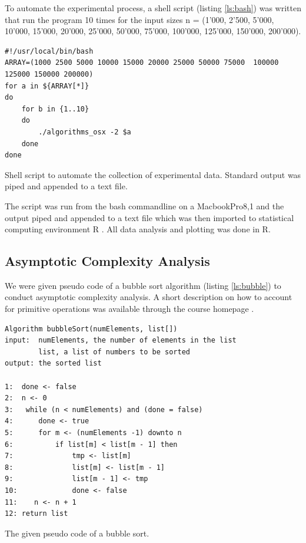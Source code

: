 \documentclass[a4paper,11pt,twoside]{article}
\begin{document}
To automate the experimental process, a shell script (listing \ref{ls:bash}) 
was written that run the program 10 times for the input sizes n = (1'000, 
2'500, 5'000, 10'000, 15'000, 20'000, 25'000, 50'000, 75'000, 100'000,
125'000, 150'000, 200'000).

\begin{listing}

\begin{verbatim}
#!/usr/local/bin/bash                                                                                           
ARRAY=(1000 2500 5000 10000 15000 20000 25000 50000 75000  100000 125000 150000 200000)
for a in ${ARRAY[*]}
do
    for b in {1..10}
    do
        ./algorithms_osx -2 $a
    done
done
\end{verbatim}
\caption{Shell script to automate the collection of experimental
  data. Standard output was piped and appended to a text file.\label{ls:bash}}
\end{listing}

The script was run from the bash commandline on a MacbookPro8,1 and
the output piped and appended to a text file which was then imported
to statistical computing environment R \cite{rlanguage}. All data analysis and
plotting was done in R. 


\subsection{Asymptotic Complexity Analysis}
We were given pseudo code of a bubble sort algorithm (listing \ref{ls:bubble})
to conduct asymptotic complexity analysis. A short description on how
to account for primitive operations was available through the course
homepage \cite{complex}.

\begin{listing}
\begin{verbatim}
Algorithm bubbleSort(numElements, list[])
input:  numElements, the number of elements in the list
        list, a list of numbers to be sorted
output: the sorted list

1:  done <- false
2:  n <- 0
3:   while (n < numElements) and (done = false)
4:      done <- true
5:      for m <- (numElements -1) downto n
6:          if list[m] < list[m - 1] then
7:              tmp <- list[m]
8:              list[m] <- list[m - 1]
9:              list[m - 1] <- tmp
10:             done <- false
11:    n <- n + 1
12: return list 
\end{verbatim}
\caption{The given pseudo code of a bubble sort.}
\end{listing}
\end{document}
